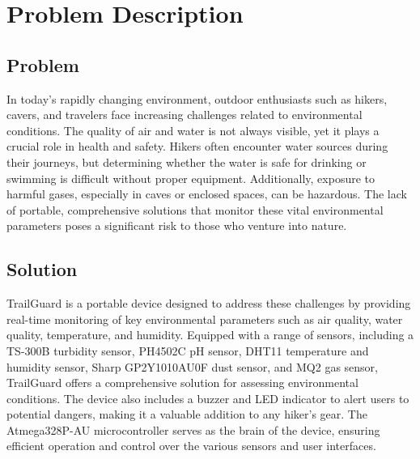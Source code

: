 \documentclass[a4paper,11pt]{article}%
\begin{document}
	

\newpage
\thispagestyle{empty}

\newpage
\tableofcontents
\pagebreak


\section{Problem Description}



\subsection{Problem}
In today’s rapidly changing environment, outdoor enthusiasts such as hikers, cavers, and travelers face increasing challenges related to environmental conditions. The quality of air and water is not always visible, yet it plays a crucial role in health and safety. Hikers often encounter water sources during their journeys, but determining whether the water is safe for drinking or swimming is difficult without proper equipment. Additionally, exposure to harmful gases, especially in caves or enclosed spaces, can be hazardous. The lack of portable, comprehensive solutions that monitor these vital environmental parameters poses a significant risk to those who venture into nature.

\subsection{Solution}
TrailGuard is a portable device designed to address these challenges by providing real-time monitoring of key environmental parameters such as air quality, water quality, temperature, and humidity. Equipped with a range of sensors, including a TS-300B turbidity sensor, PH4502C pH sensor, DHT11 temperature and humidity sensor, Sharp GP2Y1010AU0F dust sensor, and MQ2 gas sensor, TrailGuard offers a comprehensive solution for assessing environmental conditions. The device also includes a buzzer and LED indicator to alert users to potential dangers, making it a valuable addition to any hiker's gear. The Atmega328P-AU microcontroller serves as the brain of the device, ensuring efficient operation and control over the various sensors and user interfaces.
\end{document}

